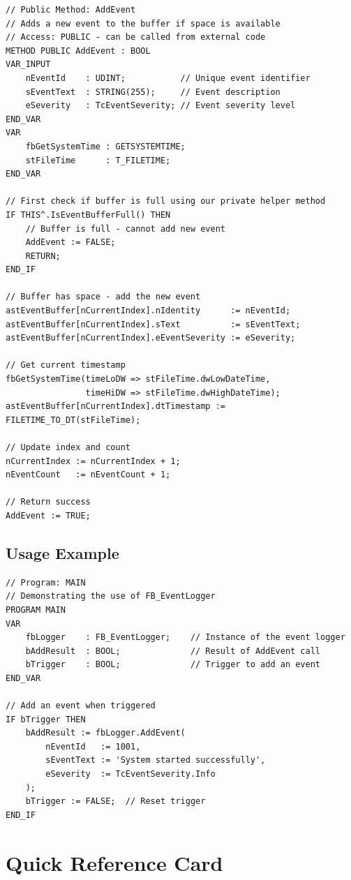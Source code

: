\documentclass[11pt,a4paper]{article}
\begin{document}
\begin{lstlisting}
// Public Method: AddEvent
// Adds a new event to the buffer if space is available
// Access: PUBLIC - can be called from external code
METHOD PUBLIC AddEvent : BOOL
VAR_INPUT
    nEventId    : UDINT;           // Unique event identifier
    sEventText  : STRING(255);     // Event description
    eSeverity   : TcEventSeverity; // Event severity level
END_VAR
VAR
    fbGetSystemTime : GETSYSTEMTIME;
    stFileTime      : T_FILETIME;
END_VAR

// First check if buffer is full using our private helper method
IF THIS^.IsEventBufferFull() THEN
    // Buffer is full - cannot add new event
    AddEvent := FALSE;
    RETURN;
END_IF

// Buffer has space - add the new event
astEventBuffer[nCurrentIndex].nIdentity      := nEventId;
astEventBuffer[nCurrentIndex].sText          := sEventText;
astEventBuffer[nCurrentIndex].eEventSeverity := eSeverity;

// Get current timestamp
fbGetSystemTime(timeLoDW => stFileTime.dwLowDateTime,
                timeHiDW => stFileTime.dwHighDateTime);
astEventBuffer[nCurrentIndex].dtTimestamp := FILETIME_TO_DT(stFileTime);

// Update index and count
nCurrentIndex := nCurrentIndex + 1;
nEventCount   := nEventCount + 1;

// Return success
AddEvent := TRUE;
\end{lstlisting}

\subsection*{Usage Example}

\begin{lstlisting}
// Program: MAIN
// Demonstrating the use of FB_EventLogger
PROGRAM MAIN
VAR
    fbLogger    : FB_EventLogger;    // Instance of the event logger
    bAddResult  : BOOL;              // Result of AddEvent call
    bTrigger    : BOOL;              // Trigger to add an event
END_VAR

// Add an event when triggered
IF bTrigger THEN
    bAddResult := fbLogger.AddEvent(
        nEventId   := 1001,
        sEventText := 'System started successfully',
        eSeverity  := TcEventSeverity.Info
    );
    bTrigger := FALSE;  // Reset trigger
END_IF
\end{lstlisting}

\section*{Quick Reference Card}
\end{document}
